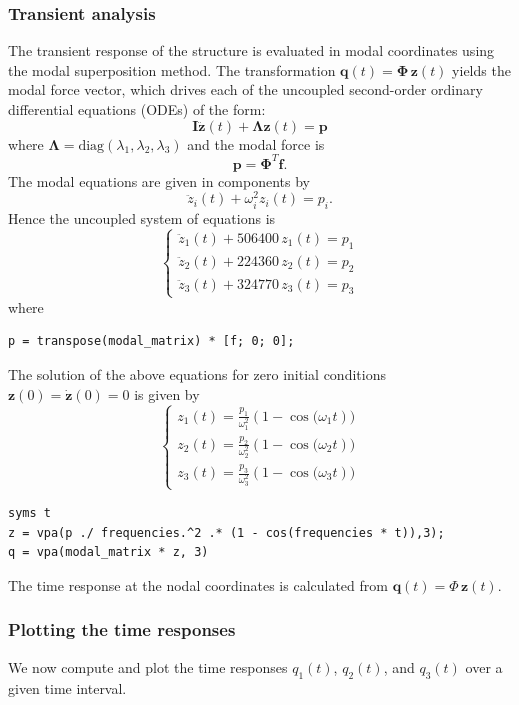 \documentclass[12pt]{article}
\begin{document}
\subsubsection*{Transient analysis}
The transient response of the structure is evaluated in modal coordinates using the modal superposition method. The transformation $\mathbf{q}(t) = \boldsymbol{\Phi} \, \mathbf{z}(t)$ yields the modal force vector, which drives each of the uncoupled second-order ordinary differential equations (ODEs) of the form:
$$\mathbf I\ddot{\mathbf z}(t)+\mathbf \Lambda\mathbf z(t)=\mathbf p$$
where $\mathbf \Lambda=\text{diag}(\lambda_1,\lambda_2,\lambda_3)$ and the modal force is
$$\mathbf p=\boldsymbol{\Phi}^T \mathbf{f}.$$
The modal equations are given in components by
$$\ddot z_i(t)+\omega_i^2 z_i(t)=p_i.$$
Hence the uncoupled system of equations is
$$\begin{cases}\ddot z_1(t)+506400\, z_1(t)=p_1 \\ \ddot z_2(t)+224360\, z_2(t)=p_2 \\ \ddot z_3(t)+324770\, z_3(t)=p_3\end{cases}$$
where
\begin{verbatim}
p = transpose(modal_matrix) * [f; 0; 0];
\end{verbatim}
The solution of the above equations for zero initial conditions $\mathbf z(0)=\dot{\mathbf z}(0)=0$ is given by
$$\begin{cases}
        z_1(t) = \frac{p_1}{\omega_1^2}(1 - \cos\big(\omega_1 t)\big) \\
        z_2(t) = \frac{p_2}{\omega_2^2}(1 - \cos\big(\omega_2 t)\big) \\
        z_3(t) = \frac{p_3}{\omega_3^2}(1 - \cos\big(\omega_3 t)\big)
    \end{cases}$$

\begin{verbatim}
syms t
z = vpa(p ./ frequencies.^2 .* (1 - cos(frequencies * t)),3);
q = vpa(modal_matrix * z, 3)
\end{verbatim}

The time response at the nodal coordinates is calculated from $\mathbf{q}(t)={\Phi}\, \mathbf z(t)$.

\subsubsection*{Plotting the time responses}
We now compute and plot the time responses $q_1(t)$, $q_2(t)$, and $q_3(t)$ over a given time interval.
\end{document}

